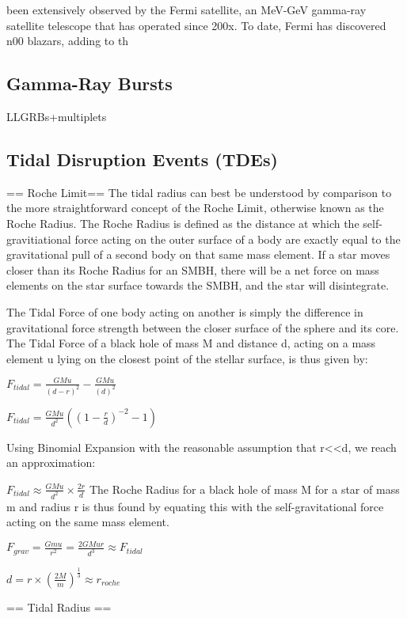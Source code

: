 \documentclass[]{article}
\begin{document}
been extensively observed by the Fermi satellite, an MeV-GeV gamma-ray satellite telescope that has operated since 200x. To date, Fermi has discovered n00 blazars, adding to th
\subsection{Gamma-Ray Bursts}

LLGRBs+multiplets

\subsection{Tidal Disruption Events (TDEs)}
== Roche Limit==
The tidal radius can best be understood by comparison to the more straightforward concept of the Roche Limit, otherwise known as the Roche Radius. The Roche Radius is defined as the distance at which the self-gravitiational force acting on the outer surface of a body are exactly equal to the gravitational pull of a second body on that same mass element. If a star moves closer than its Roche Radius for an SMBH, there will be a net force on mass elements on the star surface towards the SMBH, and the star will disintegrate.

The Tidal Force of one body acting on another is simply the difference in gravitational force strength between the closer surface of the sphere and its core. The Tidal Force of a black hole of mass M and distance d, acting on a mass element u lying on the closest point of the stellar surface, is thus given by:

$F_{tidal} = \frac{GMu}{(d-r)^{2}} - \frac{GMu}{(d)^{2}}$

$F_{tidal} = \frac{GMu}{d^{2}}((1-\frac{r}{d})^{-2} - 1 )$

Using Binomial Expansion with the reasonable assumption that r<<d, we reach an approximation:

$F_{tidal} \approx \frac{GMu}{d^{2}}\times \frac{2r}{d}$
The Roche Radius for a black hole of mass M for a star of mass m and radius r is thus found by equating this with the self-gravitational force acting on the same mass element. 

$F_{grav} = \frac{Gmu}{r^{2}} = \frac{2GMur}{d^{3}} \approx F_{tidal}$

$ d = r \times (\frac{2M}{m})^{\frac{1}{3}} \approx r_{roche}$

== Tidal Radius ==
\end{document}
